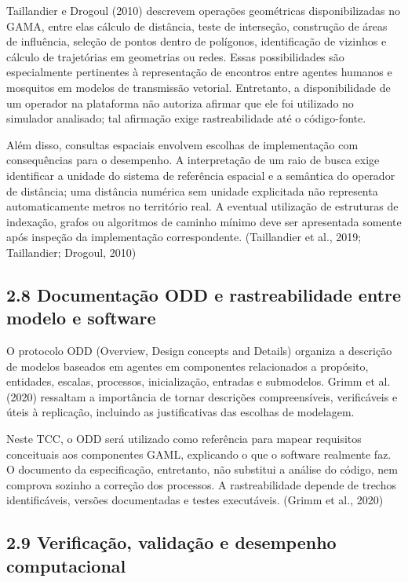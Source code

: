 Taillandier e Drogoul (2010) descrevem operações geométricas
disponibilizadas no GAMA, entre elas cálculo de distância, teste de
interseção, construção de áreas de influência, seleção de pontos dentro
de polígonos, identificação de vizinhos e cálculo de trajetórias em
geometrias ou redes. Essas possibilidades são especialmente pertinentes
à representação de encontros entre agentes humanos e mosquitos em
modelos de transmissão vetorial. Entretanto, a disponibilidade de um
operador na plataforma não autoriza afirmar que ele foi utilizado no
simulador analisado; tal afirmação exige rastreabilidade até o
código-fonte.

Além disso, consultas espaciais envolvem escolhas de implementação com
consequências para o desempenho. A interpretação de um raio de busca
exige identificar a unidade do sistema de referência espacial e a
semântica do operador de distância; uma distância numérica sem unidade
explicitada não representa automaticamente metros no território real. A
eventual utilização de estruturas de indexação, grafos ou algoritmos de
caminho mínimo deve ser apresentada somente após inspeção da
implementação correspondente. (Taillandier et al., 2019; Taillandier;
Drogoul, 2010)

\subsection{2.8 Documentação ODD e rastreabilidade entre modelo e
software}\label{documentauxe7uxe3o-odd-e-rastreabilidade-entre-modelo-e-software}

O protocolo ODD (Overview, Design concepts and Details) organiza a
descrição de modelos baseados em agentes em componentes relacionados a
propósito, entidades, escalas, processos, inicialização, entradas e
submodelos. Grimm et al. (2020) ressaltam a importância de tornar
descrições compreensíveis, verificáveis e úteis à replicação, incluindo
as justificativas das escolhas de modelagem.

Neste TCC, o ODD será utilizado como referência para mapear requisitos
conceituais aos componentes GAML, explicando o que o software realmente
faz. O documento da especificação, entretanto, não substitui a análise
do código, nem comprova sozinho a correção dos processos. A
rastreabilidade depende de trechos identificáveis, versões documentadas
e testes executáveis. (Grimm et al., 2020)

\subsection{2.9 Verificação, validação e desempenho
computacional}\label{verificauxe7uxe3o-validauxe7uxe3o-e-desempenho-computacional}

